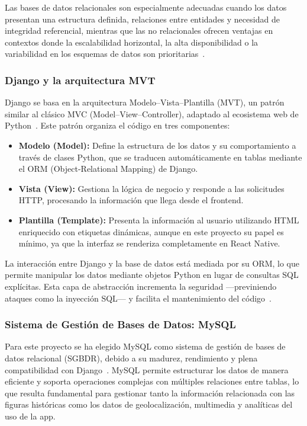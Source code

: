 Las bases de datos relacionales son especialmente adecuadas cuando los datos presentan una estructura definida, relaciones entre entidades y necesidad de integridad referencial, mientras que las no relacionales ofrecen ventajas en contextos donde la escalabilidad horizontal, la alta disponibilidad o la variabilidad en los esquemas de datos son prioritarias~\cite{stonebraker2011}.

\subsubsection{Django y la arquitectura MVT}

Django se basa en la arquitectura Modelo–Vista–Plantilla (MVT), un patrón similar al clásico MVC (Model–View–Controller), adaptado al ecosistema web de Python~\cite{vincent2020}. Este patrón organiza el código en tres componentes:

\begin{itemize}
    \item \textbf{Modelo (Model):} Define la estructura de los datos y su comportamiento a través de clases Python, que se traducen automáticamente en tablas mediante el ORM (Object-Relational Mapping) de Django.
    \item \textbf{Vista (View):} Gestiona la lógica de negocio y responde a las solicitudes HTTP, procesando la información que llega desde el frontend.
    \item \textbf{Plantilla (Template):} Presenta la información al usuario utilizando HTML enriquecido con etiquetas dinámicas, aunque en este proyecto su papel es mínimo, ya que la interfaz se renderiza completamente en React Native.
\end{itemize}

La interacción entre Django y la base de datos está mediada por su ORM, lo que permite manipular los datos mediante objetos Python en lugar de consultas SQL explícitas. Esta capa de abstracción incrementa la seguridad —previniendo ataques como la inyección SQL— y facilita el mantenimiento del código~\cite{vincent2020}.

\subsubsection{Sistema de Gestión de Bases de Datos: MySQL}

Para este proyecto se ha elegido MySQL como sistema de gestión de bases de datos relacional (SGBDR), debido a su madurez, rendimiento y plena compatibilidad con Django~\cite{oracle2023}. MySQL permite estructurar los datos de manera eficiente y soporta operaciones complejas con múltiples relaciones entre tablas, lo que resulta fundamental para gestionar tanto la información relacionada con las figuras históricas como los datos de geolocalización, multimedia y analíticas del uso de la app.

